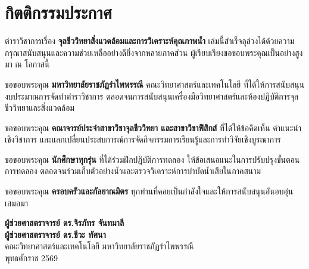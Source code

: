 \thispagestyle{empty}
\chapter*{กิตติกรรมประกาศ}

\noindent ตำราวิชาการเรื่อง \textbf{จุลชีววิทยาสิ่งแวดล้อมและการวิเคราะห์คุณภาพน้ำ} เล่มนี้สำเร็จลุล่วงได้ด้วยความกรุณาสนับสนุนและความช่วยเหลืออย่างดียิ่งจากหลายภาคส่วน ผู้เรียบเรียงขอขอบพระคุณเป็นอย่างสูงมา ณ โอกาสนี้

\noindent ขอขอบพระคุณ \textbf{มหาวิทยาลัยราชภัฏรำไพพรรณี} คณะวิทยาศาสตร์และเทคโนโลยี ที่ได้ให้การสนับสนุนงบประมาณการจัดทำตำราวิชาการ ตลอดจนการสนับสนุนเครื่องมือวิทยาศาสตร์และห้องปฏิบัติการจุลชีววิทยาและสิ่งแวดล้อม

\noindent ขอขอบพระคุณ \textbf{คณาจารย์ประจำสาขาวิชาจุลชีววิทยา และสาขาวิชาฟิสิกส์} ที่ได้ให้ข้อคิดเห็น คำแนะนำเชิงวิชาการ และแลกเปลี่ยนประสบการณ์การจัดกิจกรรมการเรียนรู้และการทำวิจัยเชิงบูรณาการ

\noindent ขอขอบพระคุณ \textbf{นักศึกษาทุกรุ่น} ที่ได้ร่วมฝึกปฏิบัติการทดลอง ให้ข้อเสนอแนะในการปรับปรุงขั้นตอนการทดลอง ตลอดจนร่วมเก็บตัวอย่างน้ำและตรวจวิเคราะห์การบำบัดน้ำเสียในภาคสนาม

\noindent ขอขอบพระคุณ \textbf{ครอบครัวและกัลยาณมิตร} ทุกท่านที่คอยเป็นกำลังใจและให้การสนับสนุนอันอบอุ่นเสมอมา

\vspace{1.5cm}
\begin{flushright}
    {\bfseries\color{waterNavy} ผู้ช่วยศาสตราจารย์ ดร.จิรภัทร จันทมาลี}\\[2pt]
    {\bfseries\color{waterNavy} ผู้ช่วยศาสตราจารย์ ดร.ชีวะ ทัศนา}\\[4pt]
    คณะวิทยาศาสตร์และเทคโนโลยี มหาวิทยาลัยราชภัฏรำไพพรรณี\\[4pt]
    {\color{slateGrey} พุทธศักราช 2569}
\end{flushright}
\clearpage
